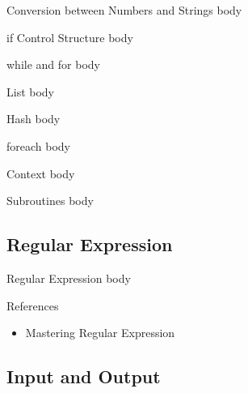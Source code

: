 \documentclass[UTF8]{beamer}
\begin{document}
\begin{frame}[t]{Conversion between Numbers and Strings}
  body
\end{frame}

\begin{frame}[t]{if Control Structure}
  body
\end{frame}

\begin{frame}[t]{while and for}
  body
\end{frame}

\begin{frame}[t]{List}
  body
\end{frame}

\begin{frame}[t]{Hash}
  body
\end{frame}

\begin{frame}[t]{foreach}
  body
\end{frame}

\begin{frame}[t]{Context}
  body
\end{frame}

\begin{frame}[t]{Subroutines}
  body
\end{frame}




\subsection{Regular Expression}

\begin{frame}[t]{Regular Expression}
  body
\end{frame}

\begin{frame}[t]{References}
  \begin{itemize}
    \item Mastering Regular Expression
  \end{itemize}
\end{frame}

\subsection{Input and Output}
\end{document}
